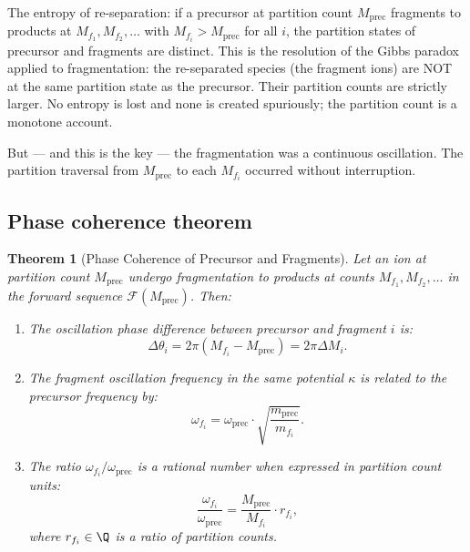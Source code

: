\documentclass[twocolumn,10pt,a4paper]{article}
\theoremstyle{thmstyle}
\newtheorem{theorem}{Theorem}[section]
\theoremstyle{definition}
\theoremstyle{remark}
\newcommand{\calF}{\mathcal{F}}
\begin{document}
The entropy of re-separation: if a precursor at partition count $M_{\text{prec}}$
fragments to products at $M_{f_1}, M_{f_2}, \ldots$ with
$M_{f_i} > M_{\text{prec}}$ for all $i$, the partition states of
precursor and fragments are distinct. This is the resolution of the
Gibbs paradox applied to fragmentation: the re-separated species (the
fragment ions) are NOT at the same partition state as the precursor.
Their partition counts are strictly larger. No entropy is lost and none
is created spuriously; the partition count is a monotone account.

But --- and this is the key --- the fragmentation was a continuous
oscillation. The partition traversal from $M_{\text{prec}}$ to each
$M_{f_i}$ occurred without interruption.

\subsection{Phase coherence theorem}

\begin{theorem}[Phase Coherence of Precursor and Fragments]
\label{thm:phase-coherence}
Let an ion at partition count $M_{\text{prec}}$ undergo fragmentation
to products at counts $M_{f_1}, M_{f_2}, \ldots$ in the forward sequence
$\calF(M_{\text{prec}})$. Then:
\begin{enumerate}[nosep,label=(\roman*)]
\item The oscillation phase difference between precursor and fragment $i$ is:
\begin{equation}
\Delta\theta_i = 2\pi(M_{f_i} - M_{\text{prec}}) = 2\pi\Delta M_i.
\label{eq:phase-diff}
\end{equation}
\item The fragment oscillation frequency in the same potential $\kappa$
is related to the precursor frequency by:
\begin{equation}
\omega_{f_i} = \omega_{\text{prec}} \cdot \sqrt{\frac{m_{\text{prec}}}{m_{f_i}}}.
\label{eq:frag-freq}
\end{equation}
\item The ratio $\omega_{f_i}/\omega_{\text{prec}}$ is a rational number
when expressed in partition count units:
\begin{equation}
\frac{\omega_{f_i}}{\omega_{\text{prec}}} = \frac{M_{\text{prec}}}{M_{f_i}}
\cdot r_{f_i},
\label{eq:rational}
\end{equation}
where $r_{f_i} \in \Q$ is a ratio of partition counts.
\end{enumerate}
\end{theorem}
\end{document}
